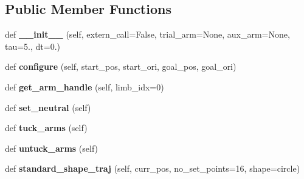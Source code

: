 \subsection*{Public Member Functions}
\begin{DoxyCompactItemize}
\item 
\hypertarget{classaml__ctrl_1_1classical__controllers_1_1_min_jerk_controller_a67156f9aad386b58bfc7f471d99cc526}{}\label{classaml__ctrl_1_1classical__controllers_1_1_min_jerk_controller_a67156f9aad386b58bfc7f471d99cc526} 
def {\bfseries \+\_\+\+\_\+init\+\_\+\+\_\+} (self, extern\+\_\+call=False, trial\+\_\+arm=None, aux\+\_\+arm=None, tau=5., dt=0.)
\item 
\hypertarget{classaml__ctrl_1_1classical__controllers_1_1_min_jerk_controller_acd75044b827ff71bec15f996077a17b7}{}\label{classaml__ctrl_1_1classical__controllers_1_1_min_jerk_controller_acd75044b827ff71bec15f996077a17b7} 
def {\bfseries configure} (self, start\+\_\+pos, start\+\_\+ori, goal\+\_\+pos, goal\+\_\+ori)
\item 
\hypertarget{classaml__ctrl_1_1classical__controllers_1_1_min_jerk_controller_aa4549f8c58d03aa508ef7f3dd5b8318e}{}\label{classaml__ctrl_1_1classical__controllers_1_1_min_jerk_controller_aa4549f8c58d03aa508ef7f3dd5b8318e} 
def {\bfseries get\+\_\+arm\+\_\+handle} (self, limb\+\_\+idx=0)
\item 
\hypertarget{classaml__ctrl_1_1classical__controllers_1_1_min_jerk_controller_a37671ba5ea1592a2bf3e169c6d060d9d}{}\label{classaml__ctrl_1_1classical__controllers_1_1_min_jerk_controller_a37671ba5ea1592a2bf3e169c6d060d9d} 
def {\bfseries set\+\_\+neutral} (self)
\item 
\hypertarget{classaml__ctrl_1_1classical__controllers_1_1_min_jerk_controller_a33f260a4253ebdeb0c8d2e6701101bc9}{}\label{classaml__ctrl_1_1classical__controllers_1_1_min_jerk_controller_a33f260a4253ebdeb0c8d2e6701101bc9} 
def {\bfseries tuck\+\_\+arms} (self)
\item 
\hypertarget{classaml__ctrl_1_1classical__controllers_1_1_min_jerk_controller_a72d1867cce1d400fc8ce0f4604da7dfc}{}\label{classaml__ctrl_1_1classical__controllers_1_1_min_jerk_controller_a72d1867cce1d400fc8ce0f4604da7dfc} 
def {\bfseries untuck\+\_\+arms} (self)
\item 
\hypertarget{classaml__ctrl_1_1classical__controllers_1_1_min_jerk_controller_a825535b9b198ad177f27d5d5689ad419}{}\label{classaml__ctrl_1_1classical__controllers_1_1_min_jerk_controller_a825535b9b198ad177f27d5d5689ad419} 
def {\bfseries standard\+\_\+shape\+\_\+traj} (self, curr\+\_\+pos, no\+\_\+set\+\_\+points=16, shape=\textquotesingle{}circle\textquotesingle{})

\end{DoxyCompactItemize}

